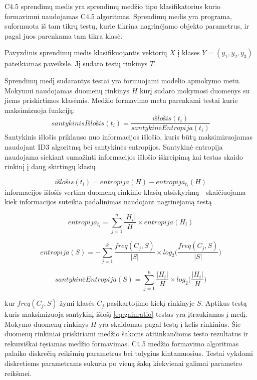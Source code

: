 C4.5 sprendimų medis yra sprendimų medžio tipo klasifikatorius kurio formavimui naudojamas C4.5 algoritmas. Sprendimų medis yra programa, suformuota iš tam tikrų testų, kurie tikrina nagrinėjamo objekto parametrus, ir pagal juos parenkama tam tikra klasė.


Pavyzdinis sprendimų medis klasifikuojantis vektorių $X$ į klases $Y = (y_1, y_2, y_3)$ pateikiamas  paveiksle. Jį sudaro testų rinkinys $T$.

Sprendimų medį sudarantys testai yra formuojami modelio apmokymo metu. Mokymui naudojamas duomenų rinkinys $H$ kurį sudaro mokymosi duomenys su jiems priskirtimos klasėmis. Medžio formavimo metu parenkami testai kurie maksimizuoja funkciją:
\begin{equation} \label{eq:gainratio}
    santykinisIšlošis(t_i) = \frac{išlošis(t_i)}{santykinėEntropija(t_i)}
\end{equation}
Santykinis išlošis priklauso nuo informacijos išlošio, kuris būtų maksimizuojamas naudojant ID3 algoritmą bei santykinės entropijos. Santykinė entropija naudojama siekiant sumažinti informacijos išlošio iškreipimą kai testas skaido rinkinį į daug skirtingų klasių \cite{c45}

\begin{equation}
    išlošis(t_i) = entropija(H) - entropija_{t_i}(H)
\end{equation}
informacijos išlošis vertina duomenų rinkinio klasių atsiskyrimą - skaičiuojama kiek informacijos suteikia padalinimas naudojant nagrinėjamą testą

\begin{equation}
    entropija_{t_i} = \sum_{j=1}^{n} \frac{|H_i|}{H} \times entropija(H_i)
\end{equation}

\begin{equation}
    entropija(S) = - \sum_{j=1}^{k} \frac{freq(C_j, S)}{|S|} \times log_2 \big( \frac{freq(C_j, S)}{|S|} \big)
\end{equation}

\begin{equation}
    santykinėEntropija(S) =  \sum_{j=1}^{n} \frac{|H_i|}{H} \times log_2 \big( \frac{|H_i|}{H} \big)
\end{equation}

kur $freq(C_j, S)$ žymi klasės $C_j$ pasikartojimo kiekį rinkinyje $S$.
Aptikus testą kuris maksimizuoja santykinį išlošį \ref{eq:gainratio} testas yra įtraukiamas į medį. Mokymo duomenų rinkinys $H$ yra skaidomas pagal testą į kelis rinkinius\cite{c45}. Šie duomenų rinkiniai priskiriami medžio šakoms atitinkančioms testo rezultatus ir rekursiškai tęsiamas medžio formavimas.
C4.5 medžio formavimo algoritmas palaiko diskrečių reikšmių parametrus bei tolygius kintamuosius. Testai vykdomi diskretiems parametrams sukuria po vieną šaką kiekvienai galimai parametro reikšmei.

